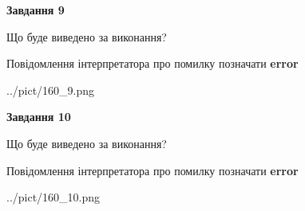 \documentclass[12pt, ukrainian]{article}
\begin{document}
{{\begin {center}\textbf{Завдання 9}\end {center}}\par
Що буде виведено за виконання? \par
Повідомлення інтерпретатора про помилку позначати \textbf{error}

\begin{center}
	{../pict/160_9.png}
\end{center}
\newpage

{\begin {center}\textbf{Завдання 10}\end {center}}\par
Що буде виведено за виконання? \par
Повідомлення інтерпретатора про помилку позначати \textbf{error}

\begin{center}
	{../pict/160_10.png}
\end{center}
\newpage

}
\end{document}

